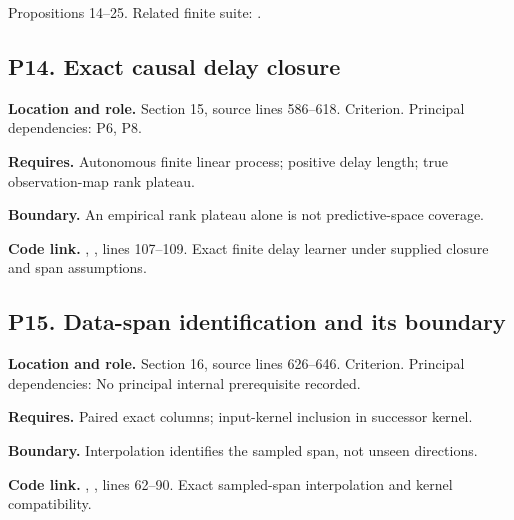 \documentclass[11pt,letterpaper]{article}
\begin{document}
Propositions 14--25. Related finite suite:
.

\par\noindent\begin{minipage}{\textwidth}
\subsection{P14. Exact causal delay
closure}\label{p14.-exact-causal-delay-closure}

\textbf{Location and role.} Section 15, source lines 586--618.
Criterion. Principal dependencies: P6, P8.

\textbf{Requires.} Autonomous finite linear process; positive delay
length; true observation-map rank plateau.

\textbf{Boundary.} An empirical rank plateau alone is not
predictive-space coverage.

\textbf{Code link.} ,
, lines 107--109. Exact finite delay learner under
supplied closure and span assumptions.
\end{minipage}\par\medskip

\par\noindent\begin{minipage}{\textwidth}
\subsection{P15. Data-span identification and its
boundary}\label{p15.-data-span-identification-and-its-boundary}

\textbf{Location and role.} Section 16, source lines 626--646.
Criterion. Principal dependencies: No principal internal prerequisite
recorded.

\textbf{Requires.} Paired exact columns; input-kernel inclusion in
successor kernel.

\textbf{Boundary.} Interpolation identifies the sampled span, not unseen
directions.

\textbf{Code link.} ,
, lines 62--90. Exact sampled-span
interpolation and kernel compatibility.
\end{minipage}\par\medskip
\end{document}
